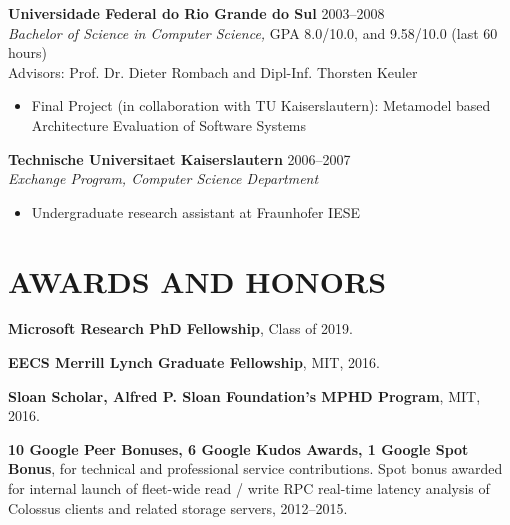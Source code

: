 \documentclass[line,margin]{res}
\begin{document}
\begin{resume}
                \textbf{Universidade Federal do Rio Grande do Sul} \hfill 2003--2008 \\
                {\sl Bachelor of Science in Computer Science,} GPA 8.0/10.0, and 9.58/10.0 (last 60 hours) \\
                Advisors: Prof. Dr. Dieter Rombach and Dipl-Inf. Thorsten Keuler
                \begin{itemize}  \itemsep -2pt
                \item  Final Project (in collaboration with TU Kaiserslautern): Metamodel based Architecture Evaluation of Software Systems
                \end{itemize}

                 \textbf{Technische Universitaet Kaiserslautern} \hfill 2006--2007 \\
                {\sl Exchange Program, Computer Science Department}
                \begin{itemize}  \itemsep -2pt
                \item  Undergraduate research assistant at Fraunhofer IESE
                \end{itemize} 

%

\section{AWARDS AND HONORS}

\textbf{Microsoft Research PhD Fellowship}, Class of 2019.

\textbf{EECS Merrill Lynch Graduate Fellowship}, MIT, 2016.


\textbf{Sloan Scholar, Alfred P. Sloan Foundation's MPHD Program}, MIT, 2016.

\textbf{10 Google Peer Bonuses, 6 Google Kudos Awards, 1 Google Spot Bonus}, for technical and professional service contributions.  Spot bonus awarded for internal launch of fleet-wide read / write RPC real-time latency analysis of Colossus clients and related storage servers, 2012--2015.


\end{resume}
\end{document}
